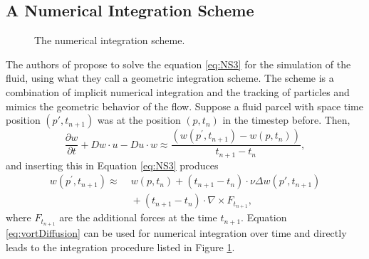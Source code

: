 \subsection{A Numerical Integration Scheme}

\begin{figure}[t]
\begin{center}\end{center}
\caption{The numerical integration scheme.}
\label{fig:fd_numericalIntegration}
\end{figure}


The authors of \cite{simplicialFluids} propose to solve the equation \ref{eq:NS3} for the simulation of the fluid, using what they call a geometric integration scheme. The scheme is a combination of implicit numerical integration and the tracking of particles and mimics the geometric behavior of the flow. Suppose a fluid parcel with space time position $(p',t_{n+1})$ was at the position $(p,t_{n})$ in the timestep before. Then, 
\[\frac{\partial w}{\partial t} + Dw\cdot u - Du \cdot w \approx  \frac{(w(p^\prime,t_{n+1}) - w(p,t_{n}))}{t_{n+1}-t_n},\]  
and inserting this in Equation \ref{eq:NS3} produces
\begin{align}w(p^\prime,t_{n+1}) \approx \;& w(p,t_n) + (t_{n+1}-t_n) \cdot \nu \Delta w(p',t_{n+1}) \nonumber \\ &{}+ (t_{n+1}-t_n) \cdot\nabla \times F_{t_{n+1}}\label{eq:vortDiffusion},\end{align}
where $F_{t_{n+1}}$ are the additional forces at the time $t_{n+1}$. Equation \ref{eq:vortDiffusion}  can be used for numerical integration over time and directly leads to the integration procedure listed in Figure \ref{fig:fd_numericalIntegration}. 

